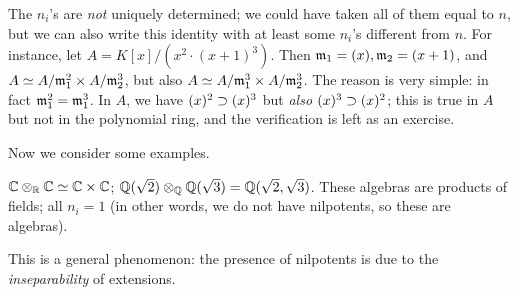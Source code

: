\begin{rmk}
The $n_i$'s are \emph{not} uniquely determined; we could have taken all of them equal to $n$, but we can also write this identity with at least some $n_i$'s different from $n$.
For instance, let $A = K[x] / (x^2 \cdot (x + 1)^3)$. Then $\mathfrak{m}_1 = (x), \mathfrak{m}_2 = (x + 1)$, and $A \simeq A / \mathfrak{m}_1^2 \times A / \mathfrak{m}_2^3$, but also $A \simeq A / \mathfrak{m}_1^3 \times A / \mathfrak{m}_2^3$.
The reason is very simple: in fact $\mathfrak{m}_1^2 = \mathfrak{m}_1^3$.
In $A$, we have $(x)^2 \supset (x)^3$ but \emph{also} $(x)^3 \supset (x)^2$; this is true in $A$ but not in the polynomial ring, and the verification is left as an exercise.
\end{rmk}

Now we consider some examples.
\begin{ex}
$\mathbb{C} \otimes_{\mathbb{R}} \mathbb{C} \simeq \mathbb{C} \times \mathbb{C}$; $\mathbb{Q}(\sqrt{2}) \otimes_{\mathbb{Q}} \mathbb{Q}(\sqrt{3}) = \mathbb{Q}(\sqrt{2}, \sqrt{3})$. 
These algebras are products of fields; all $n_i = 1$ (in other words, we do not have nilpotents, so these are  algebras).
\end{ex}

This is a general phenomenon: the presence of nilpotents is due to the \emph{inseparability} of extensions.